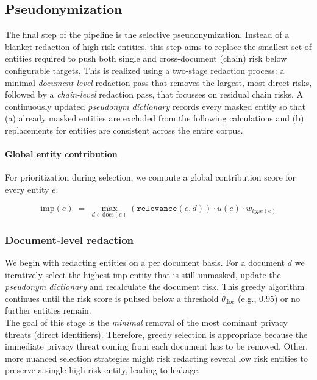 \subsection{Pseudonymization} %
The final step of the pipeline is the selective pseudonymization. Instead of a blanket redaction of high risk entities, this step aims to replace the smallest set of entities required to push both single and cross-document (chain) risk below configurable targets. This is realized using a two-stage redaction process: a minimal \textit{document level} redaction pass that removes the largest, most direct risks, followed by a \textit{chain-level} redaction pass, that focusses on residual chain risks. A continuously updated \textit{pseudonym dictionary} records every masked entity so that (a) already masked entities are excluded from the following calculations and (b) replacements for entities are consistent across the entire corpus.


\paragraph{Global entity contribution} For prioritization during selection, we compute a global contribution score for every entity $e$:

\[
\mathrm{imp}(e) \;=\; \max_{d\in\mathrm{docs}(e)} (\texttt{relevance}(e,d)) \cdot u(e) \cdot w_{type(e)}
\]


\subsubsection{Document-level redaction}
We begin with redacting entities on a per document basis. For a document $d$ we iteratively select the highest-$\mathrm{imp}$ entity that is still unmasked, update the \textit{pseudonym dictionary} and recalculate the document risk. This greedy algorithm continues until the risk score is puhsed below a threshold $\theta_{\mathrm{doc}}$ (e.g., $0.95$) or no further entities remain.\\
The goal of this stage is the \textit{minimal} removal of the most dominant privacy threats (direct identifiers). Therefore, greedy selection is appropriate because the immediate privacy threat coming from each document has to be removed. Other, more nuanced selection strategies might risk redacting several low risk entities to preserve a single high risk entity, leading to leakage. 

